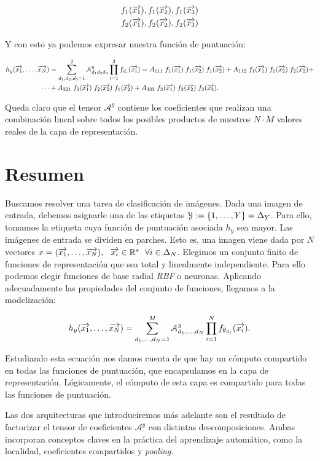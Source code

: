 \begin{equation}
	\begin{split}
		f_1(\overrightarrow{x_1}), f_1(\overrightarrow{x_2}), f_1(\overrightarrow{x_3}) \\
		f_2(\overrightarrow{x_1}), f_2(\overrightarrow{x_2}), f_2(\overrightarrow{x_3})
	\end{split}
\end{equation}

Y con esto ya podemos expresar nuestra función de puntuación:

\begin{equation}
	\begin{split}
		h_y(\overrightarrow{x_1}, \ldots, \overrightarrow{x_N}) &= \sum_{d_1, d_2, d_3 = 1}^{2} \mathcal{A}^y_{d_1 d_2 d_3} \prod_{i = 1}^3 f_{d_i}(\overrightarrow{x_i}) = A_{111} \; f_1(\overrightarrow{x_1}) \; f_1(\overrightarrow{x_2}) \; f_1(\overrightarrow{x_2}) + A_{112} \; f_1(\overrightarrow{x_1}) \; f_1(\overrightarrow{x_2}) \; f_2(\overrightarrow{x_2}) + \\
		\cdots &+ A_{321} \; f_3(\overrightarrow{x_1}) \; f_2(\overrightarrow{x_2}) \; f_1(\overrightarrow{x_2}) + A_{333} \; f_3(\overrightarrow{x_1}) \; f_3(\overrightarrow{x_2}) \; f_3(\overrightarrow{x_3}).
	\end{split}
\end{equation}

Queda claro que el tensor $\mathcal{A}^y$ contiene los coeficientes que realizan una combinación lineal sobre todos los posibles productos de nuestros $N \cdot M$ valores reales de la capa de representación.

\section{Resumen}

Buscamos resolver una tarea de clasificación de imágenes. Dada una imagen de entrada, debemos asignarle una de las etiquetas $\mathcal{Y} := \{1, \ldots, Y\} = \Delta_{Y}$. Para ello, tomamos la etiqueta cuya función de puntuación asociada $h_y$ sea mayor. Las imágenes de entrada se dividen en parches. Esto es, una imagen viene dada por $N$ vectores $x = (\overrightarrow{x_1}, \ldots, \overrightarrow{x_N}), \ \  \overrightarrow{x_i} \in \mathbb{R}^s \ \  \forall i \in \Delta_{N}$. Elegimos un conjunto finito de funciones de representación que sea total y linealmente independiente. Para ello podemos elegir funciones de base radial \textit{RBF} o neuronas. Aplicando adecuadamente las propiedades del conjunto de funciones, llegamos a la modelización:

\begin{equation}
	h_y(\overrightarrow{x_1}, \ldots, \overrightarrow{x_N}) = \sum_{d_1, \ldots, d_N = 1}^{M} \mathcal{A}^y_{d_1, \ldots, d_N} \prod_{i = 1}^N f_{\theta_{d_i}}(\overrightarrow{x_i}).
\end{equation}

Estudiando esta ecuación nos damos cuenta de que hay un cómputo compartido en todas las funciones de puntuación, que encapsulamos en la capa de representación. Lógicamente, el cómputo de esta capa es compartido para todas las funciones de puntuación.

Las dos arquitecturas que introduciremos más adelante son el resultado de factorizar el tensor de coeficientes $\mathcal{A}^y$ con distintas descomposiciones. Ambas incorporan conceptos claves en la práctica del aprendizaje automático, como la localidad, coeficientes compartidos y \textit{pooling}.
